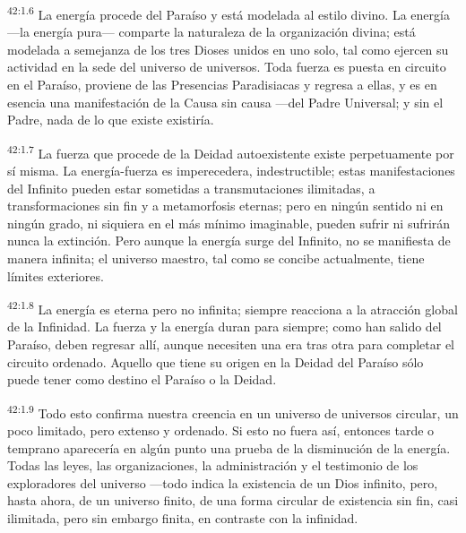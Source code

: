 \par
\textsuperscript{42:1.6} La energía procede del Paraíso y está modelada al estilo divino. La energía ---la energía pura--- comparte la naturaleza de la organización divina; está modelada a semejanza de los tres Dioses unidos en uno solo, tal como ejercen su actividad en la sede del universo de universos. Toda fuerza es puesta en circuito en el Paraíso, proviene de las Presencias Paradisiacas y regresa a ellas, y es en esencia una manifestación de la Causa sin causa ---del Padre Universal; y sin el Padre, nada de lo que existe existiría.

\par
\textsuperscript{42:1.7} La fuerza que procede de la Deidad autoexistente existe perpetuamente por sí misma. La energía-fuerza es imperecedera, indestructible; estas manifestaciones del Infinito pueden estar sometidas a transmutaciones ilimitadas, a transformaciones sin fin y a metamorfosis eternas; pero en ningún sentido ni en ningún grado, ni siquiera en el más mínimo imaginable, pueden sufrir ni sufrirán nunca la extinción. Pero aunque la energía surge del Infinito, no se manifiesta de manera infinita; el universo maestro, tal como se concibe actualmente, tiene límites exteriores.

\par
\textsuperscript{42:1.8} La energía es eterna pero no infinita; siempre reacciona a la atracción global de la Infinidad. La fuerza y la energía duran para siempre; como han salido del Paraíso, deben regresar allí, aunque necesiten una era tras otra para completar el circuito ordenado. Aquello que tiene su origen en la Deidad del Paraíso sólo puede tener como destino el Paraíso o la Deidad.

\par
\textsuperscript{42:1.9} Todo esto confirma nuestra creencia en un universo de universos circular, un poco limitado, pero extenso y ordenado. Si esto no fuera así, entonces tarde o temprano aparecería en algún punto una prueba de la disminución de la energía. Todas las leyes, las organizaciones, la administración y el testimonio de los exploradores del universo ---todo indica la existencia de un Dios infinito, pero, hasta ahora, de un universo finito, de una forma circular de existencia sin fin, casi ilimitada, pero sin embargo finita, en contraste con la infinidad.

